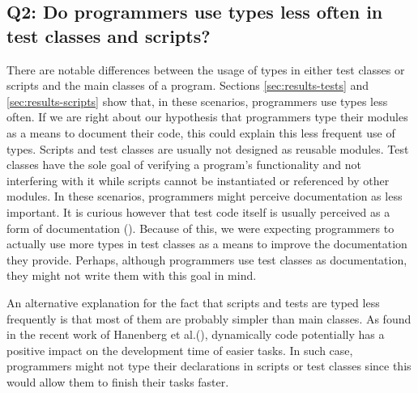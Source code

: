 \documentclass[msc]{ppgccufmg}
\begin{document}

\subsection*{Q2: Do programmers use types less often in test classes and scripts?\label{discussion-q2}}
There are notable differences between the usage of types in either test classes or scripts and the main classes of a program.
Sections \ref{sec:results-tests} and \ref{sec:results-scripts} show that, in these scenarios, programmers use types less often.
If we are right about our hypothesis that programmers type their modules as a means to document their code, this could explain this less frequent use of types.
Scripts and test classes are usually not designed as reusable modules.
Test classes have the sole goal of verifying a program's functionality and not interfering with it while scripts cannot be instantiated or referenced by other modules.
In these scenarios, programmers might perceive documentation as less important.
It is curious however that test code itself is usually perceived as a form of documentation (\cite{Beck03,Meyerovich13}).
Because of this, we were expecting programmers to actually use more types in test classes as a means to improve the documentation they provide.
Perhaps, although programmers use test classes as documentation, they might not write them with this goal in mind.

An alternative explanation for the fact that scripts and tests are typed less frequently is that most of them are probably simpler than main classes.
As found in the recent work of Hanenberg et al.(\cite{Hanenberg13}), dynamically code potentially has a positive impact on the development time of easier tasks.
In such case, programmers might not type their declarations in scripts or test classes since this would allow them to finish their tasks faster.

\end{document}
